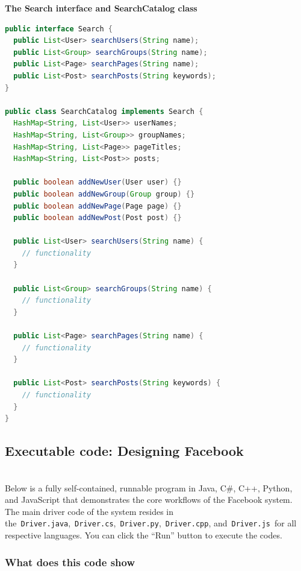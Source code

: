 \textbf{The Search interface and SearchCatalog class}

\begin{lstlisting}[language=Java]
public interface Search {
  public List<User> searchUsers(String name);
  public List<Group> searchGroups(String name);
  public List<Page> searchPages(String name);
  public List<Post> searchPosts(String keywords);
}

public class SearchCatalog implements Search {
  HashMap<String, List<User>> userNames;
  HashMap<String, List<Group>> groupNames;
  HashMap<String, List<Page>> pageTitles;
  HashMap<String, List<Post>> posts;

  public boolean addNewUser(User user) {}
  public boolean addNewGroup(Group group) {}
  public boolean addNewPage(Page page) {}
  public boolean addNewPost(Post post) {}

  public List<User> searchUsers(String name) {
    // functionality
  }

  public List<Group> searchGroups(String name) {
    // functionality
  }

  public List<Page> searchPages(String name) {
    // functionality
  }

  public List<Post> searchPosts(String keywords) {
    // functionality
  }
}
\end{lstlisting}

\subsection{Executable code: Designing Facebook}\label{Ln1qy9I-7AzywzfgVXQ7Z}
\\
Below is a fully self-contained, runnable program in Java, C\#, C++, Python, and JavaScript that demonstrates the core workflows of the Facebook system. The main driver code of the system resides in the~\texttt{Driver.java},~\texttt{Driver.cs},~\texttt{Driver.py},~\texttt{Driver.cpp}, and~\texttt{Driver.js}~for all respective languages. You can click the ``Run'' button to execute the codes.

\subsubsection{What does this code show}\label{j_YSDW2YIi08FtN0d1BkS}

